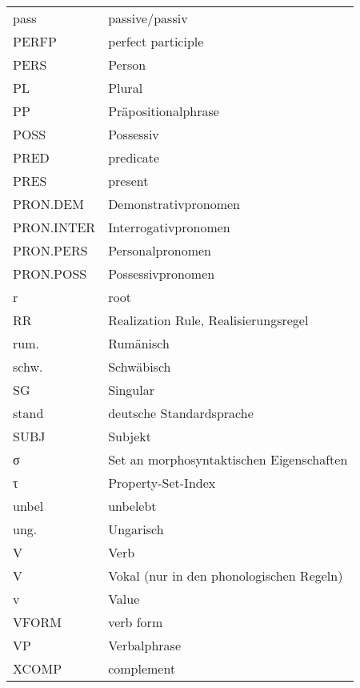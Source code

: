 \begin{tabular}{ll} 
pass          &      passive/passiv \\
PERFP          &      perfect participle \\
PERS          &      Person \\
PL          &      Plural \\
PP          &      Präpositionalphrase \\
POSS          &      Possessiv \\
PRED          &      predicate \\
PRES          &      present \\
PRON.DEM          &      Demonstrativpronomen \\
PRON.INTER          &      Interrogativpronomen \\
PRON.PERS          &      Personalpronomen \\
PRON.POSS          &      Possessivpronomen \\
r          &      root \\
RR          &      Realization Rule, Realisierungsregel \\
rum.        &    Rumänisch \\
schw.         &    Schwäbisch \\
SG          &    Singular \\
stand        &    deutsche Standardsprache \\
SUBJ        &    Subjekt \\
σ        &    Set an morphosyntaktischen Eigenschaften \\
τ        &    Property-Set-Index \\
unbel        &    unbelebt \\
ung.        &    Ungarisch \\
V        &    Verb \\
V        &    Vokal (nur in den phonologischen Regeln) \\
v        &    Value \\
VFORM        &    verb form \\
VP        &    Verbalphrase \\
XCOMP        &    complement \\
\end{tabular}
%
